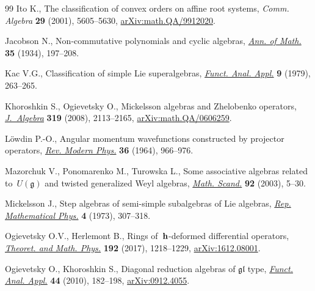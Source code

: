 \documentclass[10pt,a4paper]{amsart}
\numberwithin{equation}{section}
\begin{document}
\begin{thebibliography}{99}
Ito K., The classification of convex orders on affine root systems,
\textit{Comm. Algebra} \textbf{29} (2001), 5605--5630,
 \href{https://arxiv.org/abs/math.QA/9912020}{arXiv:math.QA/9912020}.

Jacobson N., Non-commutative polynomials and cyclic algebras, \href{https://doi.org/10.2307/1968424}{\textit{Ann. of
 Math.}} \textbf{35} (1934), 197--208.

Kac V.G., Classification of simple {L}ie superalgebras, \href{https://doi.org/10.1007/BF01075610}{\textit{Funct. Anal.
 Appl.}} \textbf{9} (1979), 263--265.

Khoroshkin S., Ogievetsky O., Mickelsson algebras and {Z}helobenko operators,
 \href{https://doi.org/10.1016/j.jalgebra.2007.04.020}{\textit{J.~Algebra}} \textbf{319} (2008), 2113--2165,
 \href{https://arxiv.org/abs/math.QA/0606259}{arXiv:math.QA/0606259}.


L\"owdin P.-O., Angular momentum wavefunctions constructed by projector
 operators, \href{https://doi.org/10.1103/RevModPhys.36.966}{\textit{Rev. Modern Phys.}} \textbf{36} (1964), 966--976.

Mazorchuk V., Ponomarenko M., Turowska L., Some associative algebras related
 to~{$U(\mathfrak g)$} and twisted generalized {W}eyl algebras, \href{https://doi.org/10.7146/math.scand.a-14392}{\textit{Math.
 Scand.}} \textbf{92} (2003), 5--30.

Mickelsson J., Step algebras of semi-simple subalgebras of {L}ie algebras,
 \href{https://doi.org/10.1016/0034-4877(73)90006-2}{\textit{Rep. Mathematical Phys.}} \textbf{4} (1973), 307--318.

Ogievetsky O.V., Herlemont B., Rings of~{$\bf h$}-deformed differential
 operators, \href{https://doi.org/10.1134/S0040577917080104}{\textit{Theoret. and Math. Phys.}} \textbf{192} (2017), 1218--1229,
 \href{https://arxiv.org/abs/1612.08001}{arXiv:1612.08001}.

 Ogievetsky O., Khoroshkin S., Diagonal reduction algebras of $\mathfrak{gl}$
 type, \href{https://doi.org/10.1007/s10688-010-0023-0}{\textit{Funct. Anal. Appl.}} \textbf{44} (2010), 182--198,
 \href{https://arxiv.org/abs/0912.4055}{arXiv:0912.4055}.


\end{thebibliography}
\end{document}
